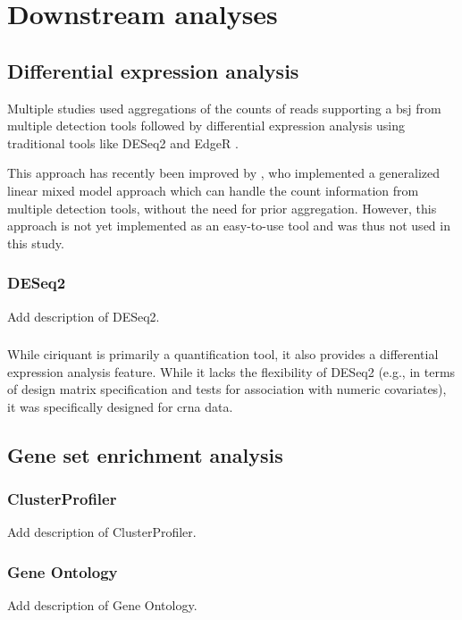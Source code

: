 \section{Downstream analyses}

\subsection{Differential expression analysis}

Multiple studies used aggregations of the counts of reads supporting a
\gls{bsj} from multiple detection tools followed by differential expression
analysis using traditional tools like DESeq2\supercite{love_moderated_2014} and
EdgeR\supercite{robinson_edger_2010}
\supercite{digby_nf-corecircrna_2023,gaffo_sensitive_2022}.

This approach has recently been improved by \textcite{buratin_detecting_2022},
who implemented a generalized linear mixed model approach which can handle the
count information from multiple detection tools, without the need for prior
aggregation\supercite{digby_computational_2024}.
However, this approach is not yet implemented as an easy-to-use tool and was
thus not used in this study.

\subsubsection{DESeq2}

Add description of DESeq2.

\subsubsection{}

While \gls{ciriquant} is primarily a quantification tool, it also provides a
differential expression analysis feature.
While it lacks the flexibility of DESeq2 (e.g., in terms of design matrix
specification and tests for association with numeric covariates), it was
specifically designed for \gls{crna} data.

\subsection{Gene set enrichment analysis}

\subsubsection{ClusterProfiler}

Add description of ClusterProfiler.

\subsubsection{Gene Ontology}

Add description of Gene Ontology.
